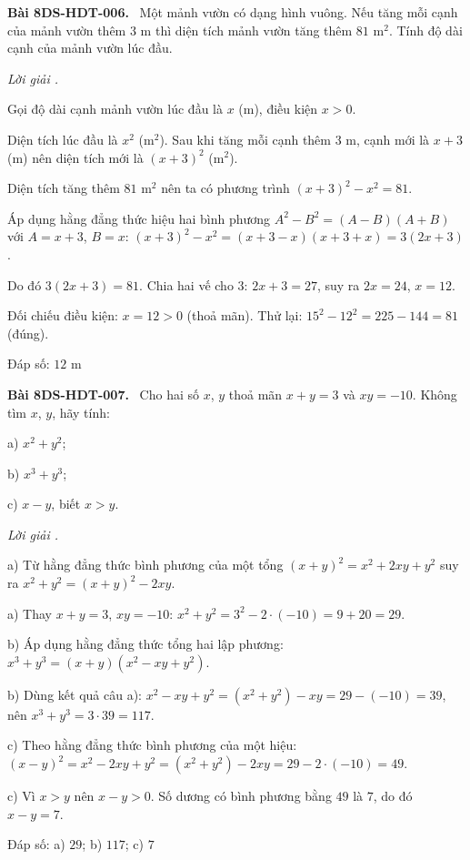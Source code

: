 \documentclass[12pt,a4paper]{article}
\newenvironment{problem}[1][]{\par\medskip\noindent\textbf{Bài #1.}\ }{\par}
\newenvironment{solution}[1][]{\par\noindent\textit{Lời giải #1.}\par}{\par}
\begin{document}
\begin{problem}[8DS-HDT-006]
Một mảnh vườn có dạng hình vuông. Nếu tăng mỗi cạnh của mảnh vườn thêm $3$ m thì diện tích mảnh vườn tăng thêm $81$ m$^2$. Tính độ dài cạnh của mảnh vườn lúc đầu.

\begin{solution}
Gọi độ dài cạnh mảnh vườn lúc đầu là $x$ (m), điều kiện $x > 0$.

Diện tích lúc đầu là $x^2$ (m$^2$). Sau khi tăng mỗi cạnh thêm $3$ m, cạnh mới là $x + 3$ (m) nên diện tích mới là $(x + 3)^2$ (m$^2$).

Diện tích tăng thêm $81$ m$^2$ nên ta có phương trình $(x + 3)^2 - x^2 = 81$.

Áp dụng hằng đẳng thức hiệu hai bình phương $A^2 - B^2 = (A - B)(A + B)$ với $A = x + 3$, $B = x$: $(x + 3)^2 - x^2 = (x + 3 - x)(x + 3 + x) = 3(2x + 3)$.

Do đó $3(2x + 3) = 81$. Chia hai vế cho $3$: $2x + 3 = 27$, suy ra $2x = 24$, $x = 12$.

Đối chiếu điều kiện: $x = 12 > 0$ (thoả mãn). Thử lại: $15^2 - 12^2 = 225 - 144 = 81$ (đúng).

Đáp số: $\boxed{12 \text{ m}}$
\end{solution}
\end{problem}

\begin{problem}[8DS-HDT-007]
Cho hai số $x$, $y$ thoả mãn $x + y = 3$ và $xy = -10$. Không tìm $x$, $y$, hãy tính:

a) $x^2 + y^2$;

b) $x^3 + y^3$;

c) $x - y$, biết $x > y$.

\begin{solution}
a) Từ hằng đẳng thức bình phương của một tổng $(x + y)^2 = x^2 + 2xy + y^2$ suy ra $x^2 + y^2 = (x + y)^2 - 2xy$.

a) Thay $x + y = 3$, $xy = -10$: $x^2 + y^2 = 3^2 - 2 \cdot (-10) = 9 + 20 = 29$.

b) Áp dụng hằng đẳng thức tổng hai lập phương: $x^3 + y^3 = (x + y)(x^2 - xy + y^2)$.

b) Dùng kết quả câu a): $x^2 - xy + y^2 = (x^2 + y^2) - xy = 29 - (-10) = 39$, nên $x^3 + y^3 = 3 \cdot 39 = 117$.

c) Theo hằng đẳng thức bình phương của một hiệu: $(x - y)^2 = x^2 - 2xy + y^2 = (x^2 + y^2) - 2xy = 29 - 2 \cdot (-10) = 49$.

c) Vì $x > y$ nên $x - y > 0$. Số dương có bình phương bằng $49$ là $7$, do đó $x - y = 7$.

Đáp số: a) $\boxed{29}$; b) $\boxed{117}$; c) $\boxed{7}$
\end{solution}
\end{problem}
\end{document}
